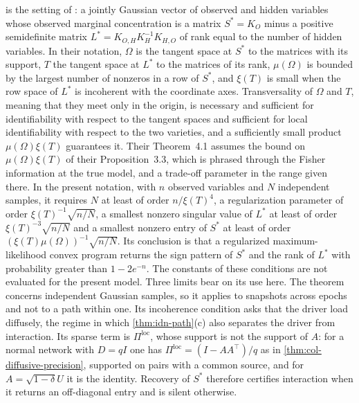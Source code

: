 \begin{remark}\label{rem:idn-cpw}
 is the setting of \citet{chandrasekaran2012latent}: a jointly Gaussian vector of observed and hidden variables whose observed marginal concentration is a matrix $S^*=K_O$ minus a positive semidefinite matrix $L^*=K_{O,H}K_H^{-1}K_{H,O}$ of rank equal to the number of hidden variables. In their notation, $\Omega$ is the tangent space at $S^*$ to the matrices with its support, $T$ the tangent space at $L^*$ to the matrices of its rank, $\mu(\Omega)$ is bounded by the largest number of nonzeros in a row of $S^*$, and $\xi(T)$ is small when the row space of $L^*$ is incoherent with the coordinate axes. Transversality of $\Omega$ and $T$, meaning that they meet only in the origin, is necessary and sufficient for identifiability with respect to the tangent spaces and sufficient for local identifiability with respect to the two varieties, and a sufficiently small product $\mu(\Omega)\xi(T)$ guarantees it. Their Theorem~4.1 assumes the bound on $\mu(\Omega)\xi(T)$ of their Proposition~3.3, which is phrased through the Fisher information at the true model, and a trade-off parameter in the range given there. In the present notation, with $n$ observed variables and $N$ independent samples, it requires $N$ at least of order $n/\xi(T)^4$, a regularization parameter of order $\xi(T)^{-1}\sqrt{n/N}$, a smallest nonzero singular value of $L^*$ at least of order $\xi(T)^{-3}\sqrt{n/N}$ and a smallest nonzero entry of $S^*$ at least of order $(\xi(T)\mu(\Omega))^{-1}\sqrt{n/N}$. Its conclusion is that a regularized maximum-likelihood convex program returns the sign pattern of $S^*$ and the rank of $L^*$ with probability greater than $1-2e^{-n}$. The constants of these conditions are not evaluated for the present model. Three limits bear on its use here. The theorem concerns independent Gaussian samples, so it applies to snapshots across epochs and not to a path within one. Its incoherence condition asks that the driver load diffusely, the regime in which \cref{thm:idn-path}(c) also separates the driver from interaction. Its sparse term is $\Pi^{\mathrm{loc}}$, whose support is not the support of $A$: for a normal network with $D=qI$ one has $\Pi^{\mathrm{loc}}=(I-AA^{\top})/q$ as in \cref{thm:col-diffusive-precision}, supported on pairs with a common source, and for $A=\sqrt{1-\delta}U$ it is the identity. Recovery of $S^*$ therefore certifies interaction when it returns an off-diagonal entry and is silent otherwise.
\end{remark}

